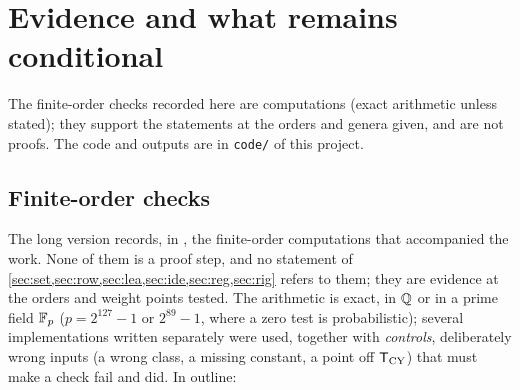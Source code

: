 \section{Evidence and what remains conditional}
\noindent{} The finite-order checks recorded here are computations (exact arithmetic unless stated); they support the statements at the orders and genera given, and are not proofs. The code and outputs are in \texttt{code/} of this project.

\label{sec:evi}

\subsection*{Finite-order checks}

The long version records, in , the finite-order computations that accompanied the work. None of them is a proof step, and no statement of \cref{sec:set,sec:row,sec:lea,sec:ide,sec:reg,sec:rig} refers to them; they are evidence at the orders and weight points tested. The arithmetic is exact, in $\mathbb{Q}$ or in a prime field $\mathbb{F}_p$ ($p=2^{127}-1$ or $2^{89}-1$, where a zero test is probabilistic); several implementations written separately were used, together with \emph{controls}, deliberately wrong inputs (a wrong class, a missing constant, a point off $\mathsf{T}_{\mathrm{CY}}$) that must make a check fail and did. In outline:
